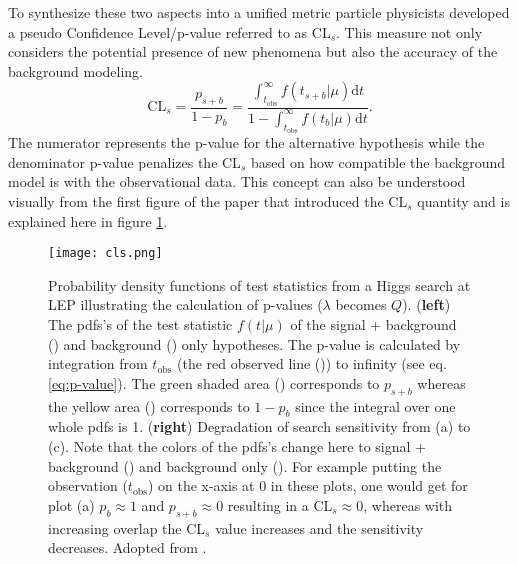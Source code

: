 To synthesize these two aspects into a unified metric particle physicists developed a pseudo Confidence Level/p-value referred to as CL$_s$. This measure not only considers the potential presence of new phenomena but also the accuracy of the background modeling.
\begin{equation}
    \mathrm{CL}_s=\frac{p_{s+b}}{1-p_{b}}=
    \frac
    {\int_{t_\text{obs}}^{\infty}
        f(t_{s+b} | \mu) \mathrm{d}t}
    {1-\int_{t_\text{obs}}^{\infty}
        f(t_{b} | \mu) \mathrm{d}t}.
\end{equation}
The numerator represents the p-value for the alternative hypothesis while the denominator p-value penalizes the CL$_s$ based on how compatible the background model is with the observational data.  This concept can also be understood visually from the first figure of the paper that introduced the CL$_s$ quantity \citep{read2002presentation} and is explained here in figure \ref{fig:cls}.
\begin{figure}
    \centering
    \texttt{[image: cls.png]}
    \caption[]{Probability density functions of test statistics from a Higgs search at LEP illustrating the calculation of p-values ($\lambda$ becomes $Q$). (\textbf{left}) The \acp{pdf}'s of the test statistic $f(t | \mu)$ of the signal + background ({\color[HTML]{804000}{$\bm{\diagup}$}}) and background ({\color[HTML]{2100FF}{$\bm{\diagup}$}}) only hypotheses. The p-value is calculated by integration from $t_\text{obs}$ (the red observed line ({\color[HTML]{FF0000}{$\bm{\diagup}$}})) to infinity (see eq. \ref{eq:p-value}). The green shaded area () corresponds to $p_{s+b}$ whereas the yellow area () corresponds to $1-p_b$ since the integral over one whole \acp{pdf} is 1. (\textbf{right}) Degradation of search sensitivity from (a) to (c). Note that the colors of the \acp{pdf}'s change here to signal + background () and background only (). For example putting the observation ($t_\text{obs}$) on the x-axis at 0 in these plots, one would get for plot (a) $p_{b}\approx 1$ and $p_{s+b}\approx 0$ resulting in a CL$_s\approx 0$, whereas with increasing overlap the CL$_s$ value increases and the sensitivity decreases. Adopted from \citep{read2002presentation}.}
    \label{fig:cls}
\end{figure}


